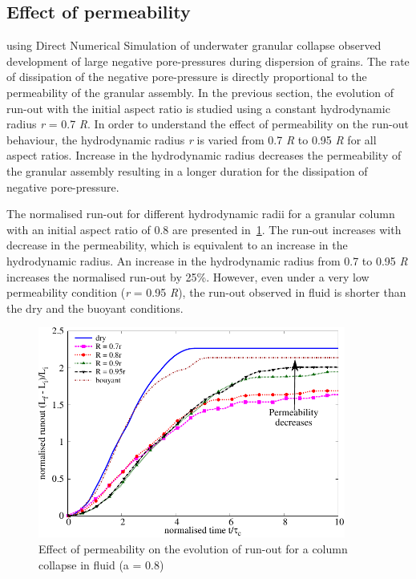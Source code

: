 \clearpage

\subsection{Effect of permeability}
\citet{Topin2011} using Direct Numerical Simulation of underwater granular 
collapse observed development of large negative pore-pressures during 
dispersion of grains. The rate of dissipation of the negative pore-pressure is 
directly proportional to the permeability of the granular assembly. In the 
previous section, the evolution of run-out with the initial aspect ratio is 
studied using a constant hydrodynamic radius \textit{r} = 0.7 \textit{R}. In 
order to 
understand 
the effect of permeability on the run-out behaviour, the hydrodynamic radius 
\textit{r} is varied from 0.7 \textit{R} to 0.95 \textit{R} for all aspect 
ratios. Increase in 
the hydrodynamic radius decreases the permeability of the granular assembly 
resulting in a longer duration for the dissipation of negative pore-pressure. 

The normalised run-out for different hydrodynamic radii for a granular column 
with an initial aspect ratio of 0.8 are presented 
in~\cref{fig:Runout_a08_dense}. The run-out increases with decrease in the 
permeability, which is equivalent to an increase in the hydrodynamic radius. 
An increase in the hydrodynamic radius from 0.7 to 0.95 \textit{R} increases 
the 
normalised run-out by 25\%. However, even under a very low permeability 
condition (\textit{r} = 0.95 \textit{R}), the run-out observed in fluid is 
shorter than the dry 
and the buoyant conditions. 

\begin{figure}[htpb]
\centering
\includegraphics[width=0.9\textwidth]{Runout_a08_dense}
\caption{Effect of permeability on the evolution of run-out for a column 
collapse in fluid (a = 0.8)}
\label{fig:Runout_a08_dense}
\end{figure}

